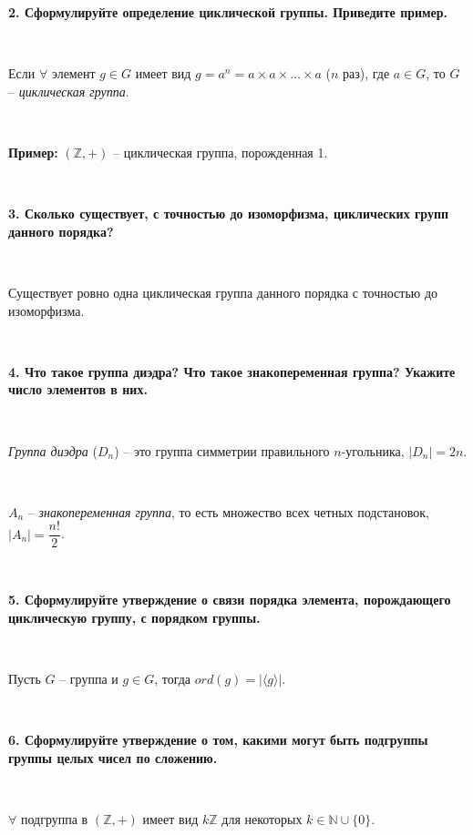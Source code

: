 \documentclass{article}
\begin{document}
	\textbf{2. Сформулируйте определение циклической группы. Приведите пример.}
	
	{
		$\;$
		\setlength{\parindent}{0.4cm}
		\hangindent=0.4cm
		
		Если $\forall$ элемент $g\in G$ имеет вид $g=a^n=a\times a\times\ldots\times a$ ($n$ раз), где $a\in G$, то $G$ -- \textit{циклическая группа}. 
		
		$\;$
		
		\textbf{Пример:} $(\mathbb{Z}, +)$ -- циклическая группа, порожденная 1.
		
		$\;$
		\setlength{\parindent}{0cm}
		\hangindent=0cm
	}
	
	\textbf{3. Сколько существует, с точностью до изоморфизма, циклических групп данного порядка?}
	
	{
		$\;$
		\setlength{\parindent}{0.4cm}
		\hangindent=0.4cm
		
		Существует ровно одна циклическая группа данного порядка с точностью до изоморфизма.
		
		$\;$
		\setlength{\parindent}{0cm}
		\hangindent=0cm
	}
	
	\textbf{4. Что такое группа диэдра? Что такое знакопеременная группа? Укажите число элементов в них.}
	
	{
		$\;$
		\setlength{\parindent}{0.4cm}
		\hangindent=0.4cm
		
		\textit{Группа диэдра} ($D_n$) -- это группа симметрии правильного $n$-угольника, $|D_n|=2n$.
		
		$\;$
		
		$A_n$ -- \textit{знакопеременная группа}, то есть множество всех четных подстановок, $|A_n|=\dfrac{n!}{2}$.
		
		$\;$
		\setlength{\parindent}{0cm}
		\hangindent=0cm
	}
	
	\textbf{5. Сформулируйте утверждение о связи порядка элемента, порождающего циклическую группу, с порядком группы.}
	
	{
		$\;$
		\setlength{\parindent}{0.4cm}
		\hangindent=0.4cm
		
		Пусть $G$ -- группа и $g\in G$, тогда $ord(g)=|\langle g\rangle|$.
		
		$\;$
		\setlength{\parindent}{0cm}
		\hangindent=0cm
	}
	
	\textbf{6. Сформулируйте утверждение о том, какими могут быть подгруппы группы целых чисел по сложению.}
	
	{
		$\;$
		\setlength{\parindent}{0.4cm}
		\hangindent=0.4cm
		
		 $\forall$ подгруппа в $(\mathbb{Z}, +)$ имеет вид $k\mathbb{Z}$ для некоторых $k\in \mathbb{N}\cup\{0\}$.
		
		$\;$
		\setlength{\parindent}{0cm}
		\hangindent=0cm
	}
	
\end{document}
